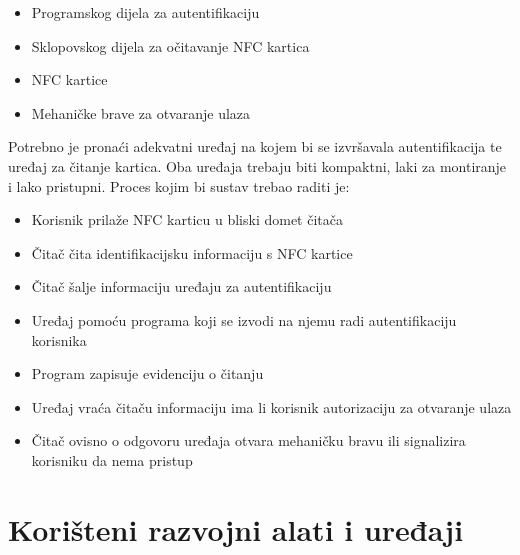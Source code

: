\documentclass[times, utf8, zavrsni]{fer}
\begin{document}
\begin{itemize}
\item Programskog dijela za autentifikaciju
\item Sklopovskog dijela za očitavanje NFC kartica
\item NFC kartice 
\item Mehaničke brave za otvaranje ulaza
\end{itemize}
Potrebno je pronaći adekvatni uređaj na kojem bi se izvršavala autentifikacija te uređaj za čitanje kartica. Oba uređaja trebaju biti kompaktni, laki za montiranje i lako pristupni.
\newline
Proces kojim bi sustav trebao raditi je:

\begin{itemize}
\item Korisnik prilaže NFC karticu u bliski domet čitača
\item Čitač čita identifikacijsku informaciju s NFC kartice
\item Čitač šalje informaciju uređaju za autentifikaciju
\item Uređaj pomoću programa koji se izvodi na njemu radi autentifikaciju korisnika
\item Program zapisuje evidenciju o čitanju
\item Uređaj vraća čitaču informaciju ima li korisnik autorizaciju za otvaranje ulaza
\item Čitač ovisno o odgovoru uređaja otvara mehaničku bravu ili signalizira korisniku da nema pristup
\end{itemize}

\section{Korišteni razvojni alati i uređaji}
\end{document}

